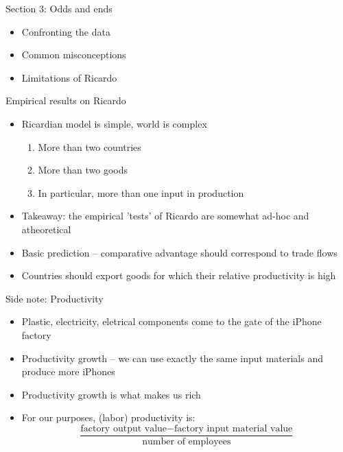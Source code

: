 \documentclass[ignorenonframetext,]{beamer}
\begin{document}
\begin{frame}
    Section 3: Odds and ends 
    \begin{itemize}
        \item Confronting the data
        \item Common misconceptions
        \item Limitations of Ricardo
    \end{itemize}
\end{frame}

\begin{frame}{Empirical results on Ricardo}

    \begin{itemize}
        \item Ricardian model is simple, world is complex
        \begin{enumerate}
            \item More than two countries
            \item More than two goods 
            \item In particular, more than one input in production
        \end{enumerate}
        \item Takeaway: the empirical 'tests' of Ricardo are somewhat ad-hoc and atheoretical
        \item Basic prediction -- comparative advantage should correspond to trade flows 
        \item Countries should export goods for which their relative productivity is high 
    \end{itemize}

\end{frame}

\begin{frame}{Side note: Productivity}

    \begin{itemize}
        \item Plastic, electricity, eletrical components come to the gate of the iPhone factory
        \item Productivity growth -- we can use exactly the same input materials and produce more iPhones
        \item Productivity growth is what makes us rich
        \item For our purposes, (labor) productivity is: 
        \begin{equation*}
            \frac{\mbox{factory output value} - \mbox{factory input material value}}{\mbox{number of employees}}
        \end{equation*}
    \end{itemize}

\end{frame}
\end{document}
